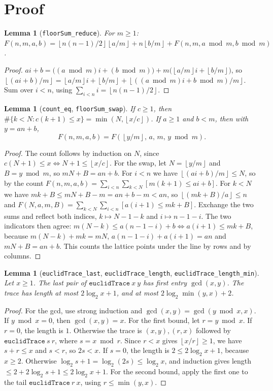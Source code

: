 \documentclass[11pt]{article}
\newtheorem{lemma}[theorem]{Lemma}
\theoremstyle{definition}
\newcommand{\fl}[1]{\left\lfloor #1 \right\rfloor}
\begin{document}
\section{Proof}

\begin{lemma}[\texttt{floorSum\_reduce}]
For $m\ge1$: $F(n,m,a,b)=\fl{n(n-1)/2}\fl{a/m}+n\fl{b/m}+F(n,m,a\bmod m,b\bmod m)$.
\end{lemma}
\begin{proof}
$ai+b=\big((a\bmod m)i+(b\bmod m)\big)+m\big(\fl{a/m}i+\fl{b/m}\big)$, so
$\fl{(ai+b)/m}=\fl{a/m}i+\fl{b/m}+\fl{((a\bmod m)i+b\bmod m)/m}$. Sum over $i<n$, using
$\sum_{i<n}i=\fl{n(n-1)/2}$.
\end{proof}

\begin{lemma}[\texttt{count\_eq}, \texttt{floorSum\_swap}]
If $c\ge1$, then $\#\{k<N: c(k+1)\le x\}=\min(N,\fl{x/c})$. If $a\ge1$ and $b<m$, then with $y=an+b$,
\[ F(n,m,a,b)=F(\fl{y/m},\,a,\,m,\,y\bmod m). \]
\end{lemma}
\begin{proof}
The count follows by induction on $N$, since $c(N+1)\le x\iff N+1\le\fl{x/c}$. For the swap, let
$N=\fl{y/m}$ and $B=y\bmod m$, so $mN+B=an+b$. For $i<n$ we have $\fl{(ai+b)/m}\le N$, so by the count
$F(n,m,a,b)=\sum_{i<n}\sum_{k<N}[m(k+1)\le ai+b]$. For $k<N$ we have
$mk+B\le mN+B-m=an+b-m<an$, so $\fl{(mk+B)/a}\le n$ and
$F(N,a,m,B)=\sum_{k<N}\sum_{i<n}[a(i+1)\le mk+B]$. Exchange the two sums and reflect both indices,
$k\mapsto N-1-k$ and $i\mapsto n-1-i$. The two indicators then agree:
$m(N-k)\le a(n-1-i)+b \iff a(i+1)\le mk+B$, because $m(N-k)+mk=mN$, $a(n-1-i)+a(i+1)=an$ and
$mN+B=an+b$. This counts the lattice points under the line by rows and by columns.
\end{proof}

\begin{lemma}[\texttt{euclidTrace\_last}, \texttt{euclidTrace\_length}, \texttt{euclidTrace\_length\_min}]
Let $x\ge1$. The last pair of $\mathtt{euclidTrace}\ x\ y$ has first entry $\gcd(x,y)$. The trace has
length at most $2\log_2 x+1$, and at most $2\log_2\min(y,x)+2$.
\end{lemma}
\begin{proof}
For the gcd, use strong induction and $\gcd(x,y)=\gcd(y\bmod x,x)$. If $y\bmod x=0$, then
$\gcd(x,y)=x$. For the first bound, let $r=y\bmod x$. If $r=0$, the length is $1$. Otherwise the
trace is $(x,y),(r,x)$ followed by $\mathtt{euclidTrace}\ s\ r$, where $s=x\bmod r$. Since $r<x$
gives $\fl{x/r}\ge1$, we have $s+r\le x$ and $s<r$, so $2s<x$. If $s=0$, the length is
$2\le 2\log_2x+1$, because $x\ge2$. Otherwise $\log_2 s+1=\log_2(2s)\le\log_2x$, and induction gives
length $\le 2+2\log_2 s+1\le2\log_2x+1$. For the second bound, apply the first one to the tail
$\mathtt{euclidTrace}\ r\ x$, using $r\le\min(y,x)$.
\end{proof}
\end{document}
